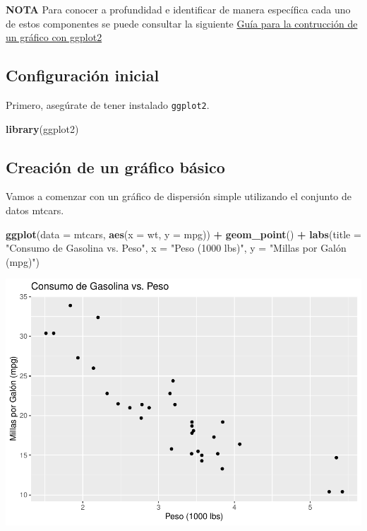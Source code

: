 \documentclass[
]{book}
\newenvironment{Shaded}{\begin{snugshade}}{\end{snugshade}}
\newcommand{\AttributeTok}[1]{\textcolor[rgb]{0.13,0.29,0.53}{#1}}
\newcommand{\FunctionTok}[1]{\textcolor[rgb]{0.13,0.29,0.53}{\textbf{#1}}}
\newcommand{\NormalTok}[1]{#1}
\newcommand{\SpecialCharTok}[1]{\textcolor[rgb]{0.81,0.36,0.00}{\textbf{#1}}}
\newcommand{\StringTok}[1]{\textcolor[rgb]{0.31,0.60,0.02}{#1}}
\begin{document}
\textbf{NOTA} Para conocer a profundidad e identificar de manera específica cada uno de estos componentes se puede consultar la siguiente \href{https://intro2r.com/graphics_r.html}{Guía para la contrucción de un gráfico con ggplot2}

\subsection{Configuración inicial}\label{configuraciuxf3n-inicial}

Primero, asegúrate de tener instalado \texttt{ggplot2}.

\begin{Shaded}
\begin{Highlighting}[]
\FunctionTok{library}\NormalTok{(ggplot2)}
\end{Highlighting}
\end{Shaded}

\subsection{Creación de un gráfico básico}\label{creaciuxf3n-de-un-gruxe1fico-buxe1sico}

Vamos a comenzar con un gráfico de dispersión simple utilizando el conjunto de datos mtcars.

\begin{Shaded}
\begin{Highlighting}[]
\FunctionTok{ggplot}\NormalTok{(}\AttributeTok{data =}\NormalTok{ mtcars, }\FunctionTok{aes}\NormalTok{(}\AttributeTok{x =}\NormalTok{ wt, }\AttributeTok{y =}\NormalTok{ mpg)) }\SpecialCharTok{+} 
  \FunctionTok{geom\_point}\NormalTok{() }\SpecialCharTok{+}
  \FunctionTok{labs}\NormalTok{(}\AttributeTok{title =} \StringTok{"Consumo de Gasolina vs. Peso"}\NormalTok{,}
       \AttributeTok{x =} \StringTok{"Peso (1000 lbs)"}\NormalTok{,}
       \AttributeTok{y =} \StringTok{"Millas por Galón (mpg)"}\NormalTok{)}
\end{Highlighting}
\end{Shaded}

\includegraphics{bookdown-demo_files/figure-latex/unnamed-chunk-176-1.pdf}
\end{document}
